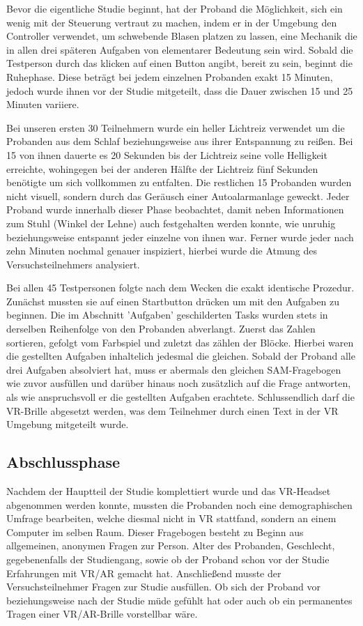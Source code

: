 Bevor die eigentliche Studie beginnt, hat der Proband die Möglichkeit, sich ein wenig mit der Steuerung vertraut zu machen, indem er in der Umgebung den Controller verwendet, um schwebende Blasen platzen zu lassen, eine Mechanik die in allen drei späteren Aufgaben von elementarer Bedeutung sein wird. Sobald die Testperson durch das klicken auf einen Button angibt, bereit zu sein, beginnt die Ruhephase. Diese beträgt bei jedem einzelnen Probanden exakt 15 Minuten, jedoch wurde ihnen vor der Studie mitgeteilt, dass die Dauer zwischen 15 und 25 Minuten variiere.

Bei unseren ersten 30 Teilnehmern wurde ein heller Lichtreiz verwendet um die Probanden aus dem Schlaf beziehungsweise aus ihrer Entspannung zu reißen. Bei 15 von ihnen dauerte es 20 Sekunden bis der Lichtreiz seine volle Helligkeit erreichte, wohingegen bei der anderen Hälfte der Lichtreiz fünf Sekunden benötigte um sich vollkommen zu entfalten. Die restlichen 15 Probanden wurden nicht visuell, sondern durch das Geräusch einer Autoalarmanlage geweckt. Jeder Proband wurde innerhalb dieser Phase beobachtet, damit neben Informationen zum Stuhl (Winkel der Lehne) auch festgehalten werden konnte, wie unruhig beziehungsweise entspannt jeder einzelne von ihnen war. Ferner wurde jeder nach zehn Minuten nochmal genauer inspiziert, hierbei wurde die Atmung des Versuchsteilnehmers analysiert.

Bei allen 45 Testpersonen folgte nach dem Wecken die exakt identische Prozedur. Zunächst mussten sie auf einen Startbutton drücken um mit den Aufgaben zu beginnen. Die im Abschnitt 'Aufgaben' geschilderten Tasks wurden stets in derselben Reihenfolge von den Probanden abverlangt. Zuerst das Zahlen sortieren, gefolgt vom Farbspiel und zuletzt das zählen der Blöcke. Hierbei waren die gestellten Aufgaben inhaltelich jedesmal die gleichen. %
Sobald der Proband alle drei Aufgaben absolviert hat, muss er abermals den gleichen SAM-Fragebogen wie zuvor ausfüllen und darüber hinaus noch zusätzlich auf die Frage antworten, als wie anspruchsvoll er die gestellten Aufgaben erachtete. Schlussendlich darf die VR-Brille abgesetzt werden, was dem Teilnehmer durch einen Text in der VR Umgebung mitgeteilt wurde.

\subsection{Abschlussphase}
Nachdem der Hauptteil der Studie komplettiert wurde und das VR-Headset abgenommen werden konnte, mussten die Probanden noch eine demographischen Umfrage bearbeiten, welche diesmal nicht in VR stattfand, sondern an einem Computer im selben Raum. Dieser Fragebogen besteht zu Beginn aus allgemeinen, anonymen Fragen zur Person. Alter des Probanden, Geschlecht, gegebenenfalls der Studiengang, sowie ob der Proband schon vor der Studie Erfahrungen mit VR/AR gemacht hat. Anschließend musste der Versuchsteilnehmer Fragen zur Studie ausfüllen. Ob sich der Proband vor beziehungsweise nach der Studie müde gefühlt hat oder auch ob ein permanentes Tragen einer VR/AR-Brille vorstellbar wäre.    

